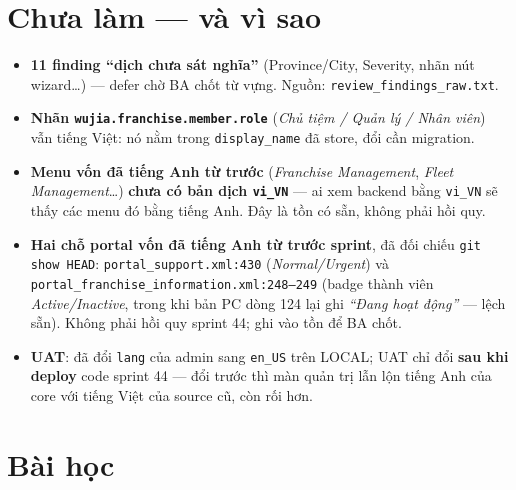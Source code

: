 \section{Chưa làm --- và vì sao}

\begin{itemize}
  \item \textbf{11 finding ``dịch chưa sát nghĩa''} (Province/City, Severity, nhãn nút wizard\ldots)
    --- defer chờ BA chốt từ vựng. Nguồn: \texttt{review\_findings\_raw.txt}.
  \item \textbf{Nhãn \texttt{wujia.franchise.member.role}} (\emph{Chủ tiệm / Quản lý / Nhân viên})
    vẫn tiếng Việt: nó nằm trong \texttt{display\_name} đã store, đổi cần migration.
  \item \textbf{Menu vốn đã tiếng Anh từ trước} (\emph{Franchise Management}, \emph{Fleet
    Management}\ldots) \textbf{chưa có bản dịch \texttt{vi\_VN}} --- ai xem backend bằng
    \texttt{vi\_VN} sẽ thấy các menu đó bằng tiếng Anh. Đây là tồn có sẵn, không phải hồi quy.
  \item \textbf{Hai chỗ portal vốn đã tiếng Anh từ trước sprint}, đã đối chiếu \texttt{git show
    HEAD}: \texttt{portal\_support.xml:430} (\emph{Normal/Urgent}) và
    \texttt{portal\_franchise\_information.xml:248--249} (badge thành viên \emph{Active/Inactive},
    trong khi bản PC dòng 124 lại ghi \emph{``Đang hoạt động''} --- lệch sẵn). Không phải hồi quy
    sprint 44; ghi vào tồn để BA chốt.
  \item \textbf{UAT}: đã đổi \texttt{lang} của admin sang \texttt{en\_US} trên LOCAL; UAT chỉ đổi
    \textbf{sau khi deploy} code sprint 44 --- đổi trước thì màn quản trị lẫn lộn tiếng Anh của core
    với tiếng Việt của source cũ, còn rối hơn.
\end{itemize}

\section{Bài học}

